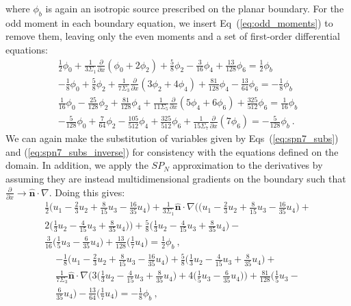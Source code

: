 where $\phi_b$ is again an isotropic source prescribed on the planar
boundary. For the odd moment in each boundary equation, we insert
Eq~(\ref{eq:odd_moments}) to remove them, leaving only the even
moments and a set of first-order differential equations:
\begin{subequations}
  \begin{gather}
    \frac{1}{2}\phi_0 + \frac{1}{3\Sigma_1}\frac{\partial}{\partial
      x}(\phi_0+2\phi_2) + \frac{5}{8}\phi_2 - \frac{3}{16}\phi_4 +
    \frac{13}{128}\phi_6 = \frac{1}{2}\phi_{b}\\ -\frac{1}{8}\phi_0 +
    \frac{5}{8}\phi_2 + \frac{1}{7\Sigma_3}\frac{\partial}{\partial
      x}(3\phi_2 + 4\phi_4) + \frac{81}{128}\phi_4 -
    \frac{13}{64}\phi_6 = -\frac{1}{8}\phi_{b}\\ \frac{1}{16}\phi_0 -
    \frac{25}{128}\phi_2 + \frac{81}{128}\phi_4 +
    \frac{1}{11\Sigma_5}\frac{\partial}{\partial x}(5\phi_4 + 6\phi_6)
    + \frac{325}{512}\phi_6 =
    \frac{1}{16}\phi_{b}\\ -\frac{5}{128}\phi_0 + \frac{7}{64}\phi_2 -
    \frac{105}{512}\phi_4 + \frac{325}{512}\phi_6 +
    \frac{1}{15\Sigma_7}\frac{\partial}{\partial x}(7\phi_6)
    = -\frac{5}{128}\phi_{b}\:.
  \end{gather}
  \label{eq:spn_bnd_subs}
\end{subequations}
We can again make the substitution of variables given by
Eqs~(\ref{eq:spn7_subs}) and (\ref{eq:spn7_subs_inverse}) for
consistency with the equations defined on the domain. In addition, we
apply the $SP_N$ approximation to the derivatives by assuming they are
instead multidimensional gradients on the boundary such that
$\frac{\partial}{\partial x} \rightarrow
\hat{\mathbf{n}}\cdot\nabla$. Doing this gives:
\begin{multline}
    \frac{1}{2}\Big(u_1 - \frac{2}{3}u_2 + \frac{8}{15}u_3 -
    \frac{16}{35}u_4\Big) +
    \frac{1}{3\Sigma_1}\hat{\mathbf{n}}\cdot\nabla\Big(\Big(u_1 -
    \frac{2}{3}u_2 + \frac{8}{15}u_3 -
    \frac{16}{35}u_4\Big)+\\2\Big(\frac{1}{3}u_2 - \frac{4}{15}u_3 +
    \frac{8}{35}u_4\Big)\Big) + \frac{5}{8}\Big(\frac{1}{3}u_2 -
    \frac{4}{15}u_3 + \frac{8}{35}u_4\Big)
    -\\ \frac{3}{16}\Big(\frac{1}{5}u_3 - \frac{6}{35}u_4\Big) +
    \frac{13}{128}\Big(\frac{1}{7}u_4\Big) = \frac{1}{2}\phi_{b}\:,
\end{multline}
\begin{multline}
    -\frac{1}{8}\Big(u_1 - \frac{2}{3}u_2 + \frac{8}{15}u_3 -
    \frac{16}{35}u_4\Big) + \frac{5}{8}\Big(\frac{1}{3}u_2 -
    \frac{4}{15}u_3 + \frac{8}{35}u_4\Big)
    +\\ \frac{1}{7\Sigma_3}\hat{\mathbf{n}}\cdot\nabla\Big
    (3\Big(\frac{1}{3}u_2 - \frac{4}{15}u_3 + \frac{8}{35}u_4\Big) +
    4\Big(\frac{1}{5}u_3 - \frac{6}{35}u_4\Big)\Big) +
    \frac{81}{128}\Big(\frac{1}{5}u_3 -\\ \frac{6}{35}u_4\Big) -
    \frac{13}{64}\Big(\frac{1}{7}u_4\Big) = -\frac{1}{8}\phi_{b}\:,
\end{multline}
